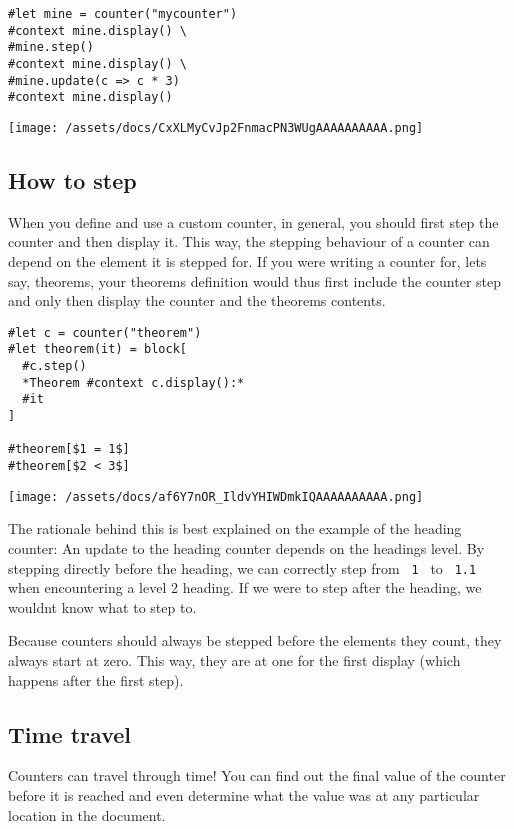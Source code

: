 \begin{verbatim}
#let mine = counter("mycounter")
#context mine.display() \
#mine.step()
#context mine.display() \
#mine.update(c => c * 3)
#context mine.display()
\end{verbatim}

\texttt{[image: /assets/docs/CxXLMyCvJp2FnmacPN3WUgAAAAAAAAAA.png]}

\subsection{How to step}\label{how-to-step}

When you define and use a custom counter, in general, you should first
step the counter and then display it. This way, the stepping behaviour
of a counter can depend on the element it is stepped for. If you were
writing a counter for, let\textquotesingle s say, theorems, your
theorem\textquotesingle s definition would thus first include the
counter step and only then display the counter and the
theorem\textquotesingle s contents.

\begin{verbatim}
#let c = counter("theorem")
#let theorem(it) = block[
  #c.step()
  *Theorem #context c.display():*
  #it
]

#theorem[$1 = 1$]
#theorem[$2 < 3$]
\end{verbatim}

\texttt{[image: /assets/docs/af6Y7nOR\_IldvYHIWDmkIQAAAAAAAAAA.png]}

The rationale behind this is best explained on the example of the
heading counter: An update to the heading counter depends on the
heading\textquotesingle s level. By stepping directly before the
heading, we can correctly step from \texttt{\ 1\ } to \texttt{\ 1.1\ }
when encountering a level 2 heading. If we were to step after the
heading, we wouldn\textquotesingle t know what to step to.

Because counters should always be stepped before the elements they
count, they always start at zero. This way, they are at one for the
first display (which happens after the first step).

\subsection{Time travel}\label{time-travel}

Counters can travel through time! You can find out the final value of
the counter before it is reached and even determine what the value was
at any particular location in the document.

